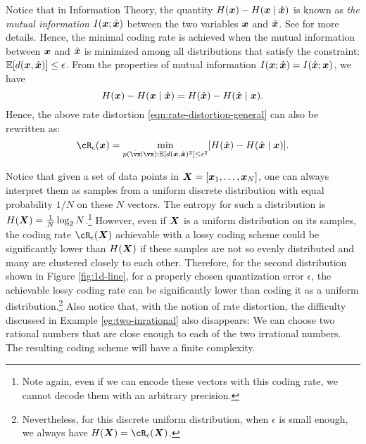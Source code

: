 \documentclass[../../book-main.tex]{subfiles}
\begin{document}
\begin{remark}
	Notice that in Information Theory, the quantity $H(\bm{x}) - H(\bm{x} \mid \hat {\bm{x}})$ is known as {\em the mutual information} $I(\bm{x}; \hat {\bm{x}})$ between the two variables $\bm{x}$ and $\hat {\bm{x}}$. See \cite{Cover-Thomas} for more details. Hence, the minimal coding rate is achieved when the mutual information between $\bm{x}$ and $\hat {\bm{x}}$ is minimized among all distributions that satisfy the constraint: $\mathbb{E} [d(\bm{x}, \hat {\bm{x}})] \le \epsilon$. From the properties of mutual information $I(\bm{x}; \hat {\bm{x}}) = I(\hat {\bm{x}}; \bm{x})$, we have  
	\begin{equation}
        H(\bm{x}) - H(\bm{x} \mid \hat{\bm{x}}) = H(\hat{\bm{x}}) - H(\hat{\bm{x}} \mid {\bm{x}}).
    \end{equation}
    Hence, the above rate distortion \eqref{eqn:rate-distortion-general} can also be rewritten as:
    \begin{equation}
		\cR_{\epsilon}(\x) = \min_{p(\hat \vx \mid \vx): \mathbb{E} [d(\x, \hat \x)^{2}] \le \epsilon^{2}} [H(\hat \x) - H(\hat \x \mid \x)].  \label{eqn:rate-distortion-general-2}
	\end{equation}
\end{remark}

\begin{remark}
	Notice that given a set of data points in $\bm{X} = [\bm{x}_1,\ldots, \bm{x}_N]$, one can always interpret them as samples from a uniform discrete distribution with equal probability $1/N$ on these $N$ vectors. The entropy for such a distribution is $H(\bm{X}) = \frac{1}{N}\log_2 N$.\footnote{Note again, even if we can encode these vectors with this coding rate, we cannot decode them with an arbitrary precision.} However, even if $\bm{X}$ is  a uniform distribution on its samples, the coding rate $\cR_{\epsilon}(\X)$ achievable with a lossy coding scheme could be significantly lower than $H(\bm{X})$ if these samples are not so evenly distributed and many are clustered closely to each other. Therefore, for the second distribution shown in Figure \ref{fig:1d-line}, for a properly chosen quantization error  $\epsilon$, the achievable lossy coding rate can be significantly lower than coding it as a uniform distribution.\footnote{Nevertheless, for this discrete uniform distribution, when $\epsilon$ is small enough, we always have $H(\X) = \cR_{\epsilon}(\X)$.} Also notice that, with the notion of rate distortion, the difficulty discussed in Example \ref{eg:two-inrational} also disappears: We can choose two rational numbers that are close enough to each of the two irrational numbers. The resulting coding scheme will have a finite complexity. 
\end{remark}
\end{document}

